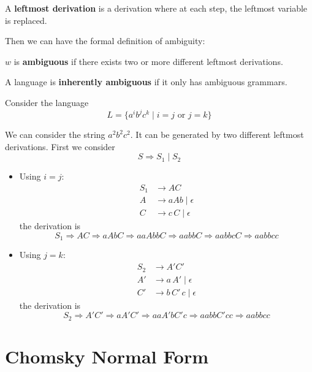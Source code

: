 \begin{definition}
    A \textbf{leftmost derivation} is a derivation where at each step, the leftmost variable is replaced.
\end{definition}

Then we can have the formal definition of ambiguity:

\begin{definition}[Ambiguous]
    $w$ is \textbf{ambiguous} if there exists two or more different leftmost derivations.
\end{definition}

\begin{definition}
    A language is \textbf{inherently ambiguous} if it only has ambiguous grammars.
\end{definition}

\begin{eg}
    Consider the language
    \[
    L = \{ a^i b^j c^k \mid i = j \text{ or } j = k \}
    \]
\end{eg}
We can consider the string $a^2 b^2 c^2$. It can be generated by two different leftmost derivations. First we consider $$S \Rightarrow S_1 \mid S_2$$
\begin{itemize}
    \item Using $i = j$:
    \begin{align*}
        S_1 &\to A C \\
        A &\to a A b \mid \epsilon \\
        C &\to c\,C \mid \epsilon
    \end{align*}
    the derivation is
    \[
    S_1 \Rightarrow AC \Rightarrow a A b C \Rightarrow a a A b b C \Rightarrow a a b b C \Rightarrow a a b b c C \Rightarrow a a b b c c
    \]
    \item Using $j = k$:
    \begin{align*}
        S_2 &\to A' C' \\
        A' &\to a\,A' \mid \epsilon \\
        C' &\to b\,C'\,c \mid \epsilon
    \end{align*}
    the derivation is
    \[
    S_2 \Rightarrow A' C' \Rightarrow a A' C' \Rightarrow a a A' b C' c \Rightarrow a a bb C' cc \Rightarrow a a bb  cc
    \]
\end{itemize}

\newpage

\section{Chomsky Normal Form}

\newpage